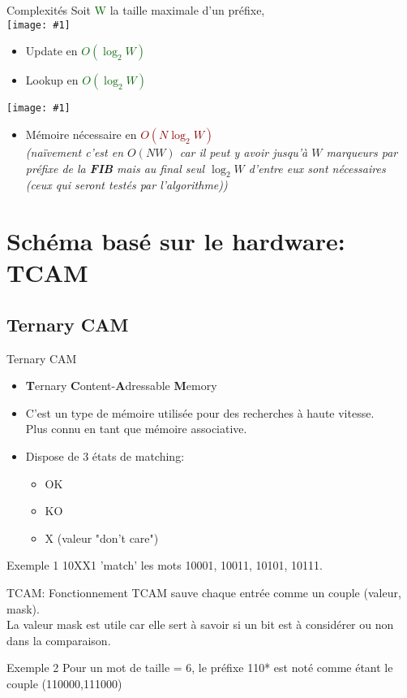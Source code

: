 \documentclass{beamer}
\newcommand{\imageR}[2]{\texttt{[image: \#1]}}
\newcommand{\gre}[1]{\textcolor{darkgreen}{#1}}
\newcommand{\red}[1]{\textcolor{darkred}{#1}}
\begin{document}
\begin{frame}{Complexités}
Soit \gre{W} la taille maximale d'un préfixe, \\$ $ \\
\imageR{good.png}{15}
\begin{itemize}
\item Update en \gre{$O(\log_2 W)$}
\item Lookup en \gre{$O(\log_2 W)$}
\end{itemize}
\imageR{bad.png}{15}
\begin{itemize}
\item Mémoire nécessaire en \red{$O(N \log_2 W)$}\\ \textit{(naïvement c'est en $O(NW)$ car il peut y avoir jusqu'à $W$ marqueurs 
par préfixe de la \textbf{FIB} mais au final seul $\log_2 W$ d'entre eux sont nécessaires (ceux qui seront testés par 
l'algorithme))}
\end{itemize}
\end{frame}


\section{Schéma basé sur le hardware: TCAM}
\subsection{Ternary CAM} 
\begin{frame}{Ternary CAM}

\begin{itemize}
\item \textbf{T}ernary \textbf{C}ontent-\textbf{A}dressable \textbf{M}emory
\item C'est un type de mémoire utilisée pour des recherches à haute vitesse. \\
Plus connu en tant que mémoire associative.
\pause \item Dispose de 3 états de matching: 
\begin{itemize}
\item OK
\item KO
\item X (valeur "don't care")
\end{itemize}
\end{itemize}
\pause
\begin{exampleblock}{Exemple 1}
10XX1 'match' les mots 10001, 10011, 10101, 10111. 
\end{exampleblock}
\end{frame}
\begin{frame}{TCAM: Fonctionnement}
TCAM sauve chaque entrée comme un couple (valeur, mask). \\
La valeur mask est utile car elle sert à savoir si un bit 
est à considérer ou non dans la comparaison. \\
\pause
\begin{exampleblock}{Exemple 2}
Pour un mot de taille = 6, le préfixe 110* est noté comme étant le couple 
(110000,111000)
\end{exampleblock}
\end{frame}
\end{document}
